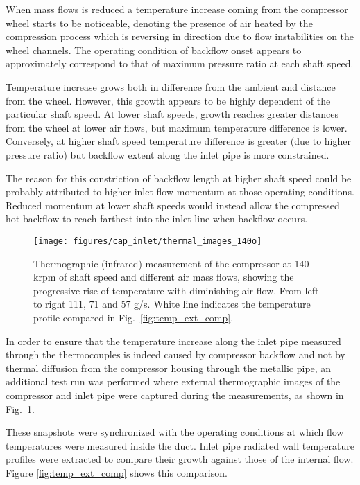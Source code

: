 When mass flows is reduced a temperature increase coming from the compressor wheel starts to be noticeable, denoting the presence of air heated by the compression process which is reversing in direction due to flow instabilities on the wheel channels. The operating condition of backflow onset appears to approximately correspond to that of maximum pressure ratio at each shaft speed.

Temperature increase grows both in difference from the ambient and distance from the wheel. However, this growth appears to be highly dependent of the particular shaft speed. At lower shaft speeds, growth reaches greater distances from the wheel at lower air flows, but maximum temperature difference is lower. Conversely, at higher shaft speed temperature difference is greater (due to higher pressure ratio) but backflow extent along the inlet pipe is more constrained.

The reason for this constriction of backflow length at higher shaft speed could be probably attributed to higher inlet flow momentum at those operating conditions. Reduced momentum at lower shaft speeds would instead allow the compressed hot backflow to reach farthest into the inlet line when backflow occurs.

\begin{figure}[!htb]
\centering
\texttt{[image: figures/cap\_inlet/thermal\_images\_140o]}
\caption[Exterior thermographic measurements]{Thermographic (infrared) measurement of the compressor at 140 krpm of shaft speed and different air mass flows, showing the progressive rise of temperature with diminishing air flow. From left to right 111, 71 and 57 g/s. White line indicates the temperature profile compared in Fig.~\ref{fig:temp_ext_comp}.}
\label{fig:thermal_images}
\end{figure}

In order to ensure that the temperature increase along the inlet pipe measured through the thermocouples is indeed caused by compressor backflow and not by thermal diffusion from the compressor housing through the metallic pipe, an additional test run was performed where external thermographic images of the compressor and inlet pipe were captured during the measurements, as shown in Fig.~\ref{fig:thermal_images}.

These snapshots were synchronized with the operating conditions at which flow temperatures were measured inside the duct. Inlet pipe radiated wall temperature profiles were extracted to compare their growth against those of the internal flow. Figure \ref{fig:temp_ext_comp} shows this comparison.

